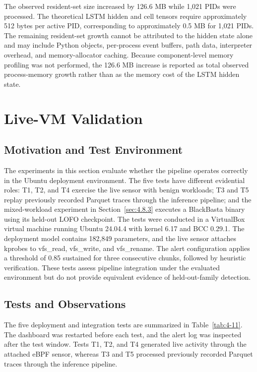 The observed resident-set size increased by 126.6 MB while 1,021 PIDs were processed. The theoretical LSTM hidden and cell tensors require approximately 512 bytes per active PID, corresponding to approximately 0.5 MB for 1,021 PIDs. The remaining resident-set growth cannot be attributed to the hidden state alone and may include Python objects, per-process event buffers, path data, interpreter overhead, and memory-allocator caching. Because component-level memory profiling was not performed, the 126.6 MB increase is reported as total observed process-memory growth rather than as the memory cost of the \textmu{}LSTM hidden state.

\section{Live-VM Validation}\label{sec:4.8}

\subsection{Motivation and Test Environment}\label{sec:4.8.1}

The experiments in this section evaluate whether the pipeline operates correctly in the Ubuntu deployment environment. The five tests have different evidential roles: T1, T2, and T4 exercise the live sensor with benign workloads; T3 and T5 replay previously recorded Parquet traces through the inference pipeline; and the mixed-workload experiment in Section~\ref{sec:4.8.3} executes a BlackBasta binary using its held-out LOFO checkpoint. The tests were conducted in a VirtualBox virtual machine running Ubuntu 24.04.4 with kernel 6.17 and BCC 0.29.1. The deployment model contains 182,849 parameters, and the live sensor attaches kprobes to vfs\_\allowbreak{}read, vfs\_\allowbreak{}write, and vfs\_\allowbreak{}rename. The alert configuration applies a threshold of 0.85 sustained for three consecutive chunks, followed by heuristic verification. These tests assess pipeline integration under the evaluated environment but do not provide equivalent evidence of held-out-family detection.

\subsection{Tests and Observations}\label{sec:4.8.2}

The five deployment and integration tests are summarized in Table~\ref{tab:4-11}. The dashboard was restarted before each test, and the alert log was inspected after the test window. Tests T1, T2, and T4 generated live activity through the attached eBPF sensor, whereas T3 and T5 processed previously recorded Parquet traces through the inference pipeline.


